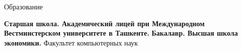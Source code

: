 \begin{rubric}{Образование}

\entry*[2016 -- 2019]%
	\textbf{Старшая школа. Академический лицей при Международном Вестминстерском университете в Ташкенте.} 
%
\entry*[2019 -- 2023]%
	\textbf{Бакалавр. Высшая школа экономики.} Факультет компьютерных наук\par
\end{rubric}